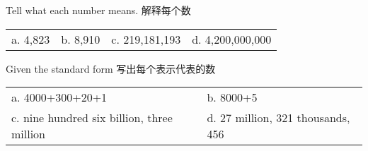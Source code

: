 \begin{example}
Tell what each number means. 解释每个数\\
\begin{tabular}{cccc}
a. 4,823& b. 8,910 & c. 219,181,193 & d. 4,200,000,000
\end{tabular}
\end{example}

\begin{example}
Given the standard form 写出每个表示代表的数\\
\begin{tabular}{ll}
a. 4000+300+20+1 & b. 8000+5 \\
c. nine hundred six billion, three million & d. 27 million, 321 thousands, 456
\end{tabular}
\end{example}
\newpage
